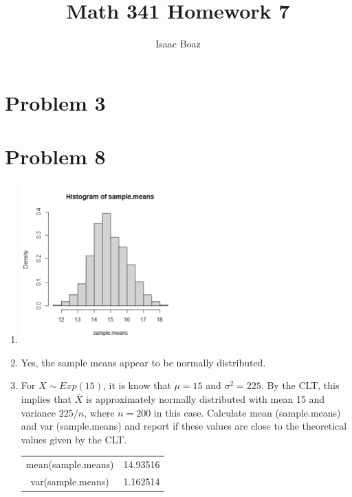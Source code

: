 \documentclass{article}
\title{\vspace{-4ex}Math 341 Homework 7}
\author{Isaac Boaz}
\begin{document}
\maketitle

\section*{Problem 3}
\pagebreak
\section*{Problem 8}

\begin{enumerate}[label=\alph*)]
    \item \includegraphics[width=0.5\textwidth]{histogram.png}
    \item Yes, the sample means appear to be normally distributed.
    \item For \(X \sim Exp(15)\), it is know that \(\mu = 15\) and \(\sigma^2 = 225\). By the CLT, this implies that \(\overline{X}\) is approximately normally distributed with mean 15 and variance \(225/n\), where \(n = 200\) in this case. Calculate mean (sample.means) and var (sample.means) and report if these values are close to the theoretical values given by the CLT. \\
          \begin{tabular}{c|c}
              mean(sample.means) & 14.93516 \\
              var(sample.means)  & 1.162514 \\
          \end{tabular}
\end{enumerate}

\pagebreak
\end{document}
